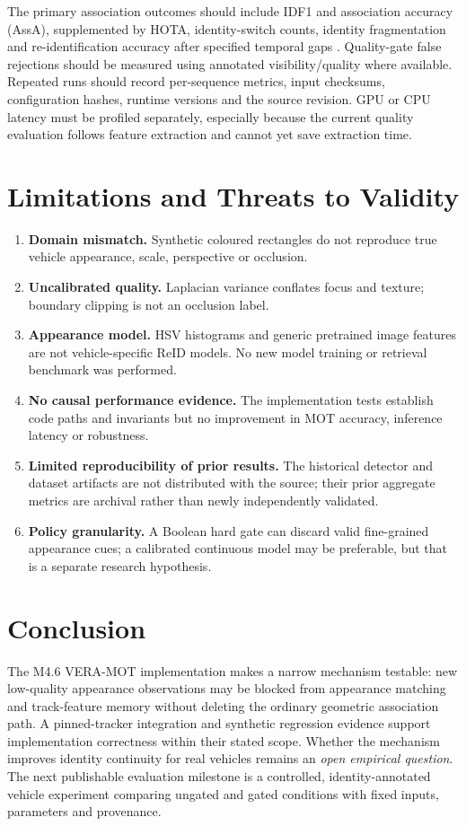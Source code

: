 \documentclass[11pt,a4paper]{article}
\begin{document}
The primary association outcomes should include IDF1 and association accuracy (AssA), supplemented by HOTA, identity-switch counts, identity fragmentation and re-identification accuracy after specified temporal gaps \cite{luiten2021}. Quality-gate false rejections should be measured using annotated visibility/quality where available. Repeated runs should record per-sequence metrics, input checksums, configuration hashes, runtime versions and the source revision. GPU or CPU latency must be profiled separately, especially because the current quality evaluation follows feature extraction and cannot yet save extraction time.

\section{Limitations and Threats to Validity}
\begin{enumerate}
\item \textbf{Domain mismatch.} Synthetic coloured rectangles do not reproduce true vehicle appearance, scale, perspective or occlusion.
\item \textbf{Uncalibrated quality.} Laplacian variance conflates focus and texture; boundary clipping is not an occlusion label.
\item \textbf{Appearance model.} HSV histograms and generic pretrained image features are not vehicle-specific ReID models. No new model training or retrieval benchmark was performed.
\item \textbf{No causal performance evidence.} The implementation tests establish code paths and invariants but no improvement in MOT accuracy, inference latency or robustness.
\item \textbf{Limited reproducibility of prior results.} The historical detector and dataset artifacts are not distributed with the source; their prior aggregate metrics are archival rather than newly independently validated.
\item \textbf{Policy granularity.} A Boolean hard gate can discard valid fine-grained appearance cues; a calibrated continuous model may be preferable, but that is a separate research hypothesis.
\end{enumerate}

\section{Conclusion}
The M4.6 VERA-MOT implementation makes a narrow mechanism testable: new low-quality appearance observations may be blocked from appearance matching and track-feature memory without deleting the ordinary geometric association path. A pinned-tracker integration and synthetic regression evidence support implementation correctness within their stated scope. Whether the mechanism improves identity continuity for real vehicles remains an \emph{open empirical question}. The next publishable evaluation milestone is a controlled, identity-annotated vehicle experiment comparing ungated and gated conditions with fixed inputs, parameters and provenance.
\end{document}

